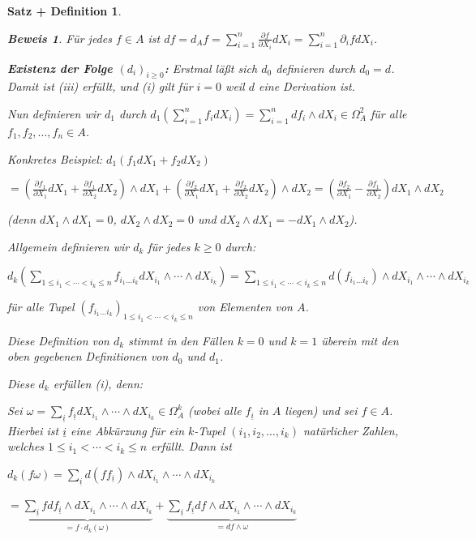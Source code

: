 \documentclass[a4paper,12pt]{scrbook}
\theoremstyle{break}
\newtheorem{SatzDef}[Satz]{Satz + Definition}
\theoremstyle{nonumberbreak}
\newtheorem{Bew}{Beweis}
\theoremstyle{nonumberplain}
\begin{document}
\begin{SatzDef}
\begin{Bew}
Für jedes $f \in A$ ist $df = d_A f = \sum_{i=1}^n \frac{\partial f}{\partial X_i}dX_i = \sum_{i=1}^n \partial_i f d X_i$.

\textbf{Existenz der Folge $\left(d_i\right)_{i\geq 0}$:} Erstmal läßt sich $d_0$ definieren durch $d_0=d$. Damit ist (iii) erfüllt, und (i) gilt für $i=0$ weil $d$ eine Derivation ist.

Nun definieren wir $d_1$ durch $d_1(\sum_{i=1}^n f_i d X_i) = \sum_{i=1}^n d f_i \wedge d X_i \in \Omega^2_A$ für alle $f_1,f_2,...,f_n\in A$.

Konkretes Beispiel: $d_1(f_1 dX_1 + f_2 dX_2)$

$= (\frac{\partial f_1}{\partial X_1} dX_1 + \frac{\partial f_1}{\partial X_2} dX_2) \wedge dX_1 + (\frac{\partial f_2}{\partial X_1} dX_1 + \frac{\partial f_2}{\partial X_2} dX_2) \wedge dX_2 = (\frac{\partial f_2}{\partial X_1} - \frac{\partial f_1}{\partial X_2}) dX_1 \wedge dX_2$

(denn $dX_1 \wedge dX_1 = 0$, $dX_2 \wedge dX_2 = 0$ und $dX_2 \wedge dX_1 = - dX_1 \wedge dX_2$).

Allgemein definieren wir $d_k$ für jedes $k\geq 0$ durch:

$d_k(\displaystyle\sum_{1 \leq i_1 < \cdots < i_k \leq n} f_{i_1 \ldots i_k} dX_{i_1} \wedge \cdots \wedge dX_{i_k}) = \sum_{1 \leq i_1 < \cdots < i_k \leq n} d(f_{i_1 \ldots i_k}) \wedge dX_{i_1} \wedge \cdots \wedge dX_{i_k}$

für alle Tupel $\left(f_{i_1 \ldots i_k}\right)_{1 \leq i_1 < \cdots < i_k \leq n}$ von Elementen von $A$.

Diese Definition von $d_k$ stimmt in den Fällen $k=0$ und $k=1$ überein mit den oben gegebenen Definitionen von $d_0$ und $d_1$.

Diese $d_k$ erfüllen (i), denn:

Sei $\omega = \sum_{\underline{i}} f_{\underline{i}} dX_{i_1} \wedge \cdots \wedge dX_{i_k} \in \Omega^k_A$ (wobei alle $f_{\underline i}$ in $A$ liegen) und sei $f \in A$. Hierbei ist $\underline{i}$ eine Abkürzung für ein $k$-Tupel $\left(i_1,i_2,\ldots ,i_k\right)$ natürlicher Zahlen, welches $1 \leq i_1 < \cdots < i_k \leq n$ erfüllt. Dann ist

$d_k(f \omega) = \sum_{\underline{i}} d(f f_{\underline{i}}) \wedge dX_{i_1} \wedge \cdots \wedge dX_{i_k}$

$= \underbrace{ \sum_{\underline{i}} f df_{\underline{i}} \wedge dX_{i_1} \wedge \cdots \wedge dX_{i_k} }_{= f \cdot d_k(\omega)} + \underbrace{ \sum_{\underline{i}} f_{\underline{i}} df \wedge dX_{i_1} \wedge \cdots \wedge dX_{i_k} }_{=d f \wedge \omega}$


\end{Bew}
\end{SatzDef}
\end{document}
